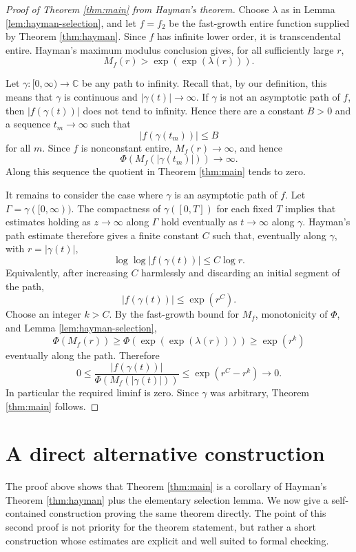\documentclass[11pt]{article}
\newcommand{\C}{\mathbb C}
\begin{document}
\begin{proof}[Proof of Theorem \ref{thm:main} from Hayman's theorem]
Choose \(\lambda\) as in Lemma \ref{lem:hayman-selection}, and let \(f=f_2\) be the
fast-growth entire function supplied by Theorem \ref{thm:hayman}.  Since \(f\)
has infinite lower order, it is transcendental entire.  Hayman's maximum
modulus conclusion gives, for all sufficiently large \(r\),
\[
M_f(r)>\exp(\exp(\lambda(r))).
\]

Let \(\gamma:[0,\infty)\to\C\) be any path to infinity.  Recall that, by our
definition, this means that \(\gamma\) is continuous and
\(|\gamma(t)|\to\infty\).  If \(\gamma\) is not an asymptotic path of \(f\),
then \(|f(\gamma(t))|\) does not tend to infinity.  Hence there are a constant
\(B>0\) and a sequence \(t_m\to\infty\) such that
\[
|f(\gamma(t_m))|\le B
\]
for all \(m\).  Since \(f\) is nonconstant entire, \(M_f(r)\to\infty\), and
hence
\[
\Phi(M_f(|\gamma(t_m)|))\to\infty .
\]
Along this sequence the quotient in Theorem \ref{thm:main} tends to zero.

It remains to consider the case where \(\gamma\) is an asymptotic path of
\(f\).  Let \(\Gamma=\gamma([0,\infty))\).  The compactness of
\(\gamma([0,T])\) for each fixed \(T\) implies that estimates holding as
\(z\to\infty\) along \(\Gamma\) hold eventually as \(t\to\infty\) along
\(\gamma\).  Hayman's path estimate therefore gives a finite constant \(C\)
such that, eventually along \(\gamma\), with \(r=|\gamma(t)|\),
\[
\log\log |f(\gamma(t))|\le C\log r.
\]
Equivalently, after increasing \(C\) harmlessly and discarding an initial
segment of the path,
\[
|f(\gamma(t))|\le \exp(r^C).
\]
Choose an integer \(k>C\).  By the fast-growth bound for \(M_f\), monotonicity
of \(\Phi\), and Lemma \ref{lem:hayman-selection},
\[
\Phi(M_f(r))
\ge
\Phi(\exp(\exp(\lambda(r))))
\ge
\exp(r^k)
\]
eventually along the path.  Therefore
\[
0\le
\frac{|f(\gamma(t))|}{\Phi(M_f(|\gamma(t)|))}
\le
\exp(r^C-r^k)\to 0 .
\]
In particular the required liminf is zero.  Since \(\gamma\) was arbitrary,
Theorem \ref{thm:main} follows.
\end{proof}

\section{A direct alternative construction}

The proof above shows that Theorem \ref{thm:main} is a corollary of Hayman's
Theorem \ref{thm:hayman} plus the elementary selection lemma.  We now give a
self-contained construction proving the same theorem directly.  The point of
this second proof is not priority for the theorem statement, but rather a short
construction whose estimates are explicit and well suited to formal checking.
\end{document}

